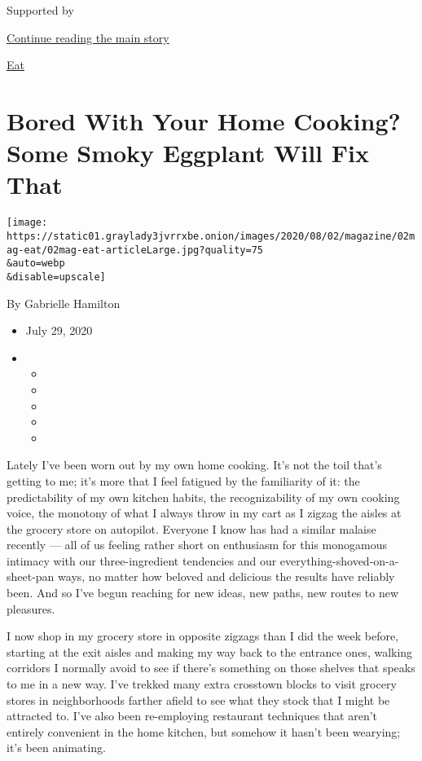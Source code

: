 Supported by

\protect\hyperlink{after-sponsor}{Continue reading the main story}

\href{/column/magazine-eat}{Eat}

\hypertarget{bored-with-your-home-cooking-some-smoky-eggplant-will-fix-that}{%
\section{Bored With Your Home Cooking? Some Smoky Eggplant Will Fix
That}\label{bored-with-your-home-cooking-some-smoky-eggplant-will-fix-that}}

\texttt{[image: https://static01.graylady3jvrrxbe.onion/images/2020/08/02/magazine/02mag-eat/02mag-eat-articleLarge.jpg?quality=75\\\&auto=webp\\\&disable=upscale]}

By Gabrielle Hamilton

\begin{itemize}
\item
  July 29, 2020
\item
  \begin{itemize}
  \item
  \item
  \item
  \item
  \item
  \end{itemize}
\end{itemize}

Lately I've been worn out by my own home cooking. It's not the toil
that's getting to me; it's more that I feel fatigued by the familiarity
of it: the predictability of my own kitchen habits, the recognizability
of my own cooking voice, the monotony of what I always throw in my cart
as I zigzag the aisles at the grocery store on autopilot. Everyone I
know has had a similar malaise recently --- all of us feeling rather
short on enthusiasm for this monogamous intimacy with our
three-ingredient tendencies and our everything-shoved-on-a-sheet-pan
ways, no matter how beloved and delicious the results have reliably
been. And so I've begun reaching for new ideas, new paths, new routes to
new pleasures.

I now shop in my grocery store in opposite zigzags than I did the week
before, starting at the exit aisles and making my way back to the
entrance ones, walking corridors I normally avoid to see if there's
something on those shelves that speaks to me in a new way. I've trekked
many extra crosstown blocks to visit grocery stores in neighborhoods
farther afield to see what they stock that I might be attracted to. I've
also been re-employing restaurant techniques that aren't entirely
convenient in the home kitchen, but somehow it hasn't been wearying;
it's been animating.

